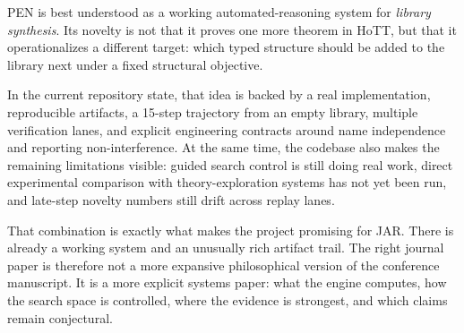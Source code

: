 \documentclass[11pt,a4paper]{article}
\begin{document}
PEN is best understood as a working automated-reasoning system for \emph{library synthesis}. Its novelty is not that it proves one more theorem in HoTT, but that it operationalizes a different target: which typed structure should be added to the library next under a fixed structural objective.

In the current repository state, that idea is backed by a real implementation, reproducible artifacts, a 15-step trajectory from an empty library, multiple verification lanes, and explicit engineering contracts around name independence and reporting non-interference. At the same time, the codebase also makes the remaining limitations visible: guided search control is still doing real work, direct experimental comparison with theory-exploration systems has not yet been run, and late-step novelty numbers still drift across replay lanes.

That combination is exactly what makes the project promising for JAR. There is already a working system and an unusually rich artifact trail. The right journal paper is therefore not a more expansive philosophical version of the conference manuscript. It is a more explicit systems paper: what the engine computes, how the search space is controlled, where the evidence is strongest, and which claims remain conjectural.
\end{document}
